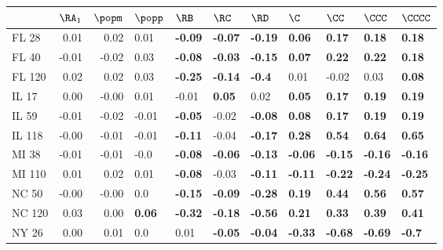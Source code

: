 \begin{tabular}{lrrllllllll}
\toprule
{} &  $\RA_1$ &  $\popm$ &        $\popp$ &           $\RB$ &           $\RC$ &           $\RD$ &            $\C$ &           $\CC$ &          $\CCC$ &         $\CCCC$ \\
\midrule
FL 28   &     0.01 &     0.02 &           0.01 &  \textbf{-0.09} &  \textbf{-0.07} &  \textbf{-0.19} &   \textbf{0.06} &   \textbf{0.17} &   \textbf{0.18} &   \textbf{0.18} \\
FL 40   &    -0.01 &    -0.02 &           0.03 &  \textbf{-0.08} &  \textbf{-0.03} &  \textbf{-0.15} &   \textbf{0.07} &   \textbf{0.22} &   \textbf{0.22} &   \textbf{0.18} \\
FL 120  &     0.02 &     0.02 &           0.03 &  \textbf{-0.25} &  \textbf{-0.14} &   \textbf{-0.4} &            0.01 &           -0.02 &            0.03 &   \textbf{0.08} \\
IL 17   &     0.00 &    -0.00 &           0.01 &           -0.01 &   \textbf{0.05} &            0.02 &   \textbf{0.05} &   \textbf{0.17} &   \textbf{0.19} &   \textbf{0.19} \\
IL 59   &    -0.01 &    -0.02 &          -0.01 &  \textbf{-0.05} &           -0.02 &  \textbf{-0.08} &   \textbf{0.08} &   \textbf{0.17} &   \textbf{0.19} &   \textbf{0.19} \\
IL 118  &    -0.00 &    -0.01 &          -0.01 &  \textbf{-0.11} &           -0.04 &  \textbf{-0.17} &   \textbf{0.28} &   \textbf{0.54} &   \textbf{0.64} &   \textbf{0.65} \\
MI 38   &    -0.01 &    -0.01 &           -0.0 &  \textbf{-0.08} &  \textbf{-0.06} &  \textbf{-0.13} &  \textbf{-0.06} &  \textbf{-0.15} &  \textbf{-0.16} &  \textbf{-0.16} \\
MI 110  &     0.01 &     0.02 &           0.01 &  \textbf{-0.08} &           -0.03 &  \textbf{-0.11} &  \textbf{-0.11} &  \textbf{-0.22} &  \textbf{-0.24} &  \textbf{-0.25} \\
NC 50   &    -0.00 &    -0.00 &            0.0 &  \textbf{-0.15} &  \textbf{-0.09} &  \textbf{-0.28} &   \textbf{0.19} &   \textbf{0.44} &   \textbf{0.56} &   \textbf{0.57} \\
NC 120  &     0.03 &     0.00 &  \textbf{0.06} &  \textbf{-0.32} &  \textbf{-0.18} &  \textbf{-0.56} &   \textbf{0.21} &   \textbf{0.33} &   \textbf{0.39} &   \textbf{0.41} \\
NY 26   &     0.00 &     0.01 &            0.0 &            0.01 &  \textbf{-0.05} &  \textbf{-0.04} &  \textbf{-0.33} &  \textbf{-0.68} &  \textbf{-0.69} &   \textbf{-0.7} \\

\end{tabular}
